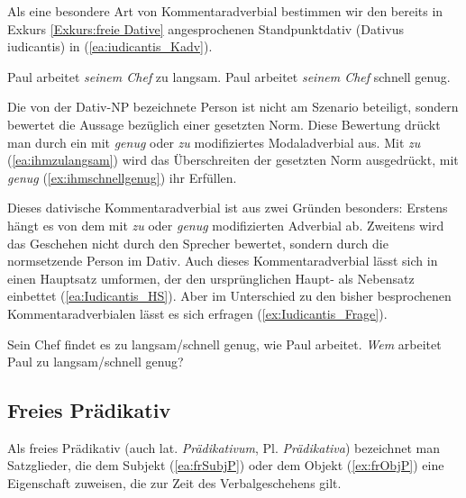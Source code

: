 \ea \label{ea:K-Erfragung/Negation}
\label{ea:*Erfragung} 
\label{ex:Erfagung ModAdv}
\label{ex:K-negSatz}
\label{ex:*Negation}
\label{ex:Negation ModAdv} 
\z 
\z 

Als eine besondere Art von Kommentaradverbial bestimmen wir den bereits in Exkurs \ref{Exkurs:freie Dative} angesprochenen Standpunktdativ (Dativus iudicantis) in (\ref{ea:iudicantis_Kadv}).

\ea \label{ea:iudicantis_Kadv}
\ea \label{ea:ihmzulangsam} Paul arbeitet \textit{seinem Chef} zu langsam.
\ex \label{ex:ihmschnellgenug} Paul arbeitet \textit{seinem Chef} schnell genug.
\z 
\z 

Die von der Dativ-NP bezeichnete Person ist nicht am Szenario beteiligt, sondern bewertet die Aussage bezüglich einer gesetzten Norm. Diese Bewertung drückt man durch ein mit \textit{genug} oder \textit{zu} modifiziertes Modaladverbial aus. Mit \textit{zu} (\ref{ea:ihmzulangsam}) wird das Überschreiten der gesetzten Norm ausgedrückt, mit \textit{genug} (\ref{ex:ihmschnellgenug}) ihr Erfüllen. 

Dieses dativische Kommentaradverbial ist aus zwei Gründen besonders: Erstens hängt es von dem mit \textit{zu} oder \textit{genug} modifizierten Adverbial ab. Zweitens wird das Geschehen nicht durch den Sprecher bewertet, sondern durch die normsetzende Person im Dativ. Auch dieses Kommentaradverbial lässt sich in einen Hauptsatz umformen, der den ursprünglichen Haupt- als Nebensatz einbettet (\ref{ea:Iudicantis_HS}). Aber im Unterschied zu den bisher besprochenen Kommentaradverbialen lässt es sich erfragen (\ref{ex:Iudicantis_Frage}).

\ea \label{ea:Iudicantis_HS_Frage}
\ea \label{ea:Iudicantis_HS} Sein Chef findet es zu langsam/schnell genug, wie Paul arbeitet.
\ex \label{ex:Iudicantis_Frage} \textit{Wem} arbeitet Paul zu langsam/schnell genug?
\z 
\z 


\subsection{Freies Prädikativ}\label{subsection:freiePräd}

Als freies Prädikativ (auch lat. \textit{Prädikativum}, Pl. \textit{Prädikativa}) bezeichnet man Satzglieder, die dem Subjekt (\ref{ea:frSubjP}) oder dem Objekt (\ref{ex:frObjP}) eine Eigenschaft zuweisen, die zur Zeit des Verbalgeschehens gilt.

